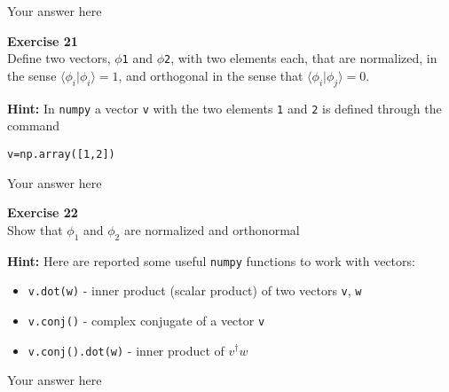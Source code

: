 \documentclass{article}
\begin{document}
Your answer here

\begin{mdframed}
\textbf{Exercise 21}\\
Define two vectors, \texttt{$\phi$1} and \texttt{$\phi$2}, with two elements each, that are normalized, in the sense $\langle\phi_i|\phi_i\rangle=1$, and orthogonal in the sense that $\langle\phi_i|\phi_j\rangle=0$.

\textbf{Hint:} In \texttt{numpy} a vector \texttt{v} with the two elements \texttt{1} and \texttt{2} is defined through the command

\begin{verbatim}
v=np.array([1,2])
\end{verbatim}
\end{mdframed}

Your answer here

\begin{mdframed}
\textbf{Exercise 22}\\
Show that $\phi_1$ and $\phi_2$ are normalized and orthonormal

\textbf{Hint:} Here are reported some useful \texttt{numpy} functions to work with vectors:

\begin{itemize}
\item \texttt{v.dot(w)} - inner product (scalar product) of two vectors \texttt{v}, \texttt{w}
\item \texttt{v.conj()} - complex conjugate of a vector \texttt{v}
\item \texttt{v.conj().dot(w)} - inner product of $v^\dagger w$
\end{itemize}
\end{mdframed}

Your answer here
\end{document}
